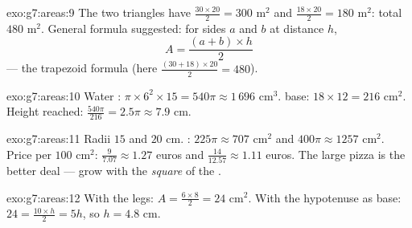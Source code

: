 \begin{solution}{exo:g7:areas:9}
The two triangles have  $\frac{30 \times 20}{2} = 300$ m$^2$
and $\frac{18 \times 20}{2} = 180$ m$^2$: total $480$ m$^2$. General
formula suggested: for  sides $a$ and $b$ at distance $h$,
\[
A = \frac{(a + b) \times h}{2}
\]
--- the trapezoid formula (here $\frac{(30+18)\times 20}{2} = 480$).
\end{solution}

\begin{solution}{exo:g7:areas:10}
Water : $\pi \times 6^2 \times 15 = 540\pi \approx 1\,696$
cm$^3$.  base: $18 \times 12 = 216$ cm$^2$. Height reached:
$\frac{540\pi}{216} = 2.5\pi \approx 7.9$ cm.
\end{solution}

\begin{solution}{exo:g7:areas:11}
Radii $15$ and $20$ cm. : $225\pi \approx 707$ cm$^2$ and
$400\pi \approx 1257$ cm$^2$. Price per $100$ cm$^2$:
$\frac{9}{7.07} \approx 1.27$ euros and
$\frac{14}{12.57} \approx 1.11$ euros. The large pizza is the better
deal ---  grow with the \emph{square} of the .
\end{solution}

\begin{solution}{exo:g7:areas:12}
With the legs: $A = \frac{6 \times 8}{2} = 24$ cm$^2$. With the
hypotenuse as base: $24 = \frac{10 \times h}{2} = 5h$, so
$h = 4.8$ cm.
\end{solution}

